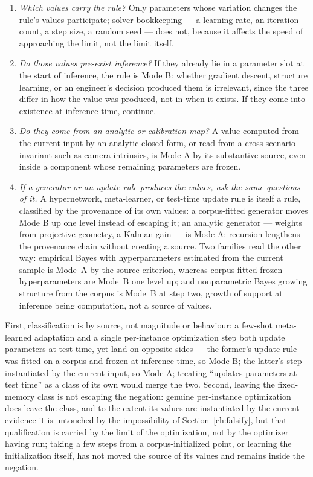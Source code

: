 \begin{enumerate}
\item \emph{Which values carry the rule?} Only parameters whose variation changes the rule's values participate; solver bookkeeping --- a learning rate, an iteration count, a step size, a random seed --- does not, because it affects the speed of approaching the limit, not the limit itself.
\item \emph{Do those values pre-exist inference?} If they already lie in a parameter slot at the start of inference, the rule is Mode B: whether gradient descent, structure learning, or an engineer's decision produced them is irrelevant, since the three differ in how the value was produced, not in when it exists. If they come into existence at inference time, continue.
\item \emph{Do they come from an analytic or calibration map?} A value computed from the current input by an analytic closed form, or read from a cross-scenario invariant such as camera intrinsics, is Mode A by its substantive source, even inside a component whose remaining parameters are frozen.
\item \emph{If a generator or an update rule produces the values, ask the same questions of it.} A hypernetwork, meta-learner, or test-time update rule is itself a rule, classified by the provenance of its own values: a corpus-fitted generator moves Mode B up one level instead of escaping it; an analytic generator --- weights from projective geometry, a Kalman gain --- is Mode A; recursion lengthens the provenance chain without creating a source. Two families read the other way: empirical Bayes with hyperparameters estimated from the current sample is Mode~A by the source criterion, whereas corpus-fitted frozen hyperparameters are Mode~B one level up; and nonparametric Bayes growing structure from the corpus is Mode~B at step two, growth of support at inference being computation, not a source of values.
\end{enumerate}

First, classification is by source, not magnitude or behaviour: a few-shot meta-learned adaptation and a single per-instance optimization step both update parameters at test time, yet land on opposite sides --- the former's update rule was fitted on a corpus and frozen at inference time, so Mode B; the latter's step instantiated by the current input, so Mode A; treating ``updates parameters at test time'' as a class of its own would merge the two. Second, leaving the fixed-memory class is not escaping the negation: genuine per-instance optimization does leave the class, and to the extent its values are instantiated by the current evidence it is untouched by the impossibility of Section~\ref{ch:falsify}, but that qualification is carried by the limit of the optimization, not by the optimizer having run; taking a few steps from a corpus-initialized point, or learning the initialization itself, has not moved the source of its values and remains inside the negation.

